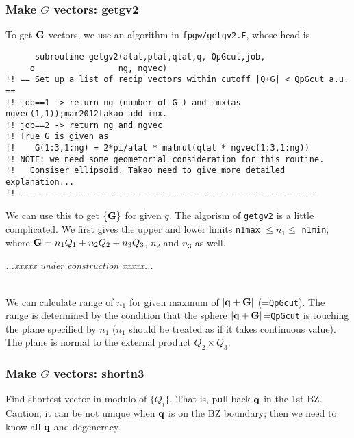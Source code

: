 \documentclass[a4paper,10pt,epsf,fleqn]{article}
\def\underconstruction{{\it...xxxxx under construction xxxxx...\\}}
\newcommand{\bfq}{{\bf q}}
\newcommand{\bfG}{{\bf G}}
\begin{document}
\subsubsection{Make $G$ vectors: getgv2}
To get $\bfG$ vectors, we use an algorithm in \verb!fpgw/getgv2.F!, whose head
is
\begin{verbatim}
      subroutine getgv2(alat,plat,qlat,q, QpGcut,job,
     o                 ng, ngvec)
!! == Set up a list of recip vectors within cutoff |Q+G| < QpGcut a.u. ==
!! job==1 -> return ng (number of G ) and imx(as ngvec(1,1));mar2012takao add imx.
!! job==2 -> return ng and ngvec
!! True G is given as
!!    G(1:3,1:ng) = 2*pi/alat * matmul(qlat * ngvec(1:3,1:ng))
!! NOTE: we need some geometorial consideration for this routine.
!!   Consiser ellipsoid. Takao need to give more detailed explanation...
!! -------------------------------------------------------------
\end{verbatim}
We can use this to get $\{\bfG\}$ for given $q$.
The algorism of \verb!getgv2! is a little complicated.
We first gives the upper and lower limits {\tt n1max} $\le n_1 \le $ {\tt n1min}, 
where $\bfG= n_1 Q_1 + n_2 Q_2 + n_3 Q_3$, $n_2$ and $n_3$ as well.

\underconstruction

\\
We can calculate range of $n_1$ for given maxmum of $|\bfq+\bfG|$ (={\tt QpGcut}).
The range is determined by the condition that the sphere $|\bfq+\bfG|$={\tt QpGcut}
is touching the plane specified by $n_1$ ($n_1$ should be treated as if it takes continuous value). The plane is normal to the external product $Q_2 \times Q_3$.


\subsubsection{Make $G$ vectors: shortn3}
Find shortest vector in modulo of $\{Q_i\}$. That is, pull back $\bfq$ in the 1st BZ.
Caution; it can be not unique when $\bfq$ is on the BZ boundary;
then we need to know all $\bfq$ and degeneracy.
\end{document}
